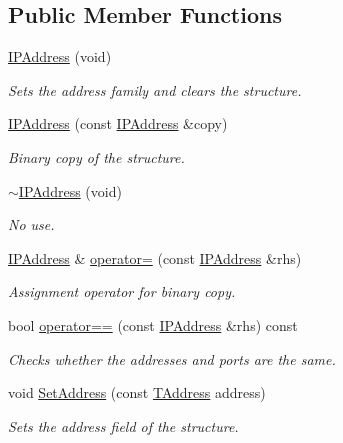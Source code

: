 \subsection*{Public Member Functions}
\begin{DoxyCompactItemize}
\item 
\hyperlink{class_i_p_address_a1333231aa0a638d7d730a5c89ae868c9}{I\-P\-Address} (void)
\begin{DoxyCompactList}\small\item\em Sets the address family and clears the structure. \end{DoxyCompactList}\item 
\hyperlink{class_i_p_address_a9b64b50f64853fd06487c77e0baaaf4a}{I\-P\-Address} (const \hyperlink{class_i_p_address}{I\-P\-Address} \&copy)
\begin{DoxyCompactList}\small\item\em Binary copy of the structure. \end{DoxyCompactList}\item 
\hyperlink{class_i_p_address_a877ef12fd67c5064b7188a95e570a28b}{$\sim$\-I\-P\-Address} (void)
\begin{DoxyCompactList}\small\item\em No use. \end{DoxyCompactList}\item 
\hyperlink{class_i_p_address}{I\-P\-Address} \& \hyperlink{class_i_p_address_adebc20befea4d99f6ffd058d999480b2}{operator=} (const \hyperlink{class_i_p_address}{I\-P\-Address} \&rhs)
\begin{DoxyCompactList}\small\item\em Assignment operator for binary copy. \end{DoxyCompactList}\item 
bool \hyperlink{class_i_p_address_acaa3d485fedf874453d3fd0ab7e93a64}{operator==} (const \hyperlink{class_i_p_address}{I\-P\-Address} \&rhs) const 
\begin{DoxyCompactList}\small\item\em Checks whether the addresses and ports are the same. \end{DoxyCompactList}\item 
void \hyperlink{class_i_p_address_ade47d25d834bfb952fcf7fb2867db21e}{Set\-Address} (const \hyperlink{class_i_p_address_a36831f63346275f44e8747d77a2a5d51}{T\-Address} address)
\begin{DoxyCompactList}\small\item\em Sets the address field of the structure. \end{DoxyCompactList}\item 

\end{DoxyCompactItemize}
